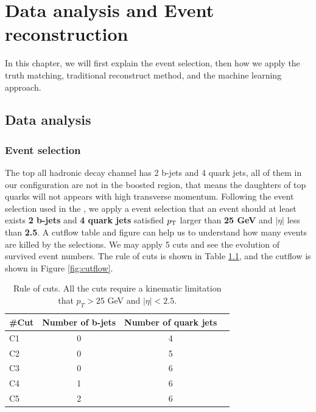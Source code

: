 \chapter{Data analysis and Event reconstruction}\label{section:Reconstruction}

In this chapter, we will first explain the event selection, then how we apply the truth matching, traditional reconstruct method, and the machine learning approach.

\section{Data analysis}\label{sec:Data analysis}

\subsection{Event selection}\label{subsec:Event selection}
The top all hadronic decay channel has 2 b-jets and 4 quark jets, all of them in our configuration are not in the boosted region, that means the daughters of top quarks will not appears with high transverse momentum. Following the event selection used in the \cite{Mccarthy:2015ucy},  we apply a event selection that an event should at least exists \textbf{2 b-jets} and \textbf{4 quark jets} satisfied $p_{\rm T}$ larger than \textbf{25 GeV} and $|\eta|$ less than \textbf{2.5}. A cutflow table and figure can help us to understand how many events are killed by the selections. We may apply 5 cuts and see the evolution of survived event numbers. The rule of cuts is shown in Table \ref{table:cuts}, and the cutflow is shown in Figure \ref{fig:cutflow}.
\\
\begin{center}
	\begin{table}[h]
		\begin{tabular}{p{} c c c }
			\cline{1-3}
			\#Cut    & Number of b-jets & Number of quark jets  \\
			\hline
			C1      &   0  & 4    \\
			C2      &   0  & 5    \\
			C3      &   0  & 6    \\
			C4      &   1  & 6    \\
			C5      &   2  & 6    \\
			\hline
		\end{tabular}
		\caption{Rule of cuts. All the cuts require a kinematic limitation that $p_{T} > 25$ GeV and $|\eta|<2.5$.}
		\label{table:cuts}
	\end{table}
\end{center}

